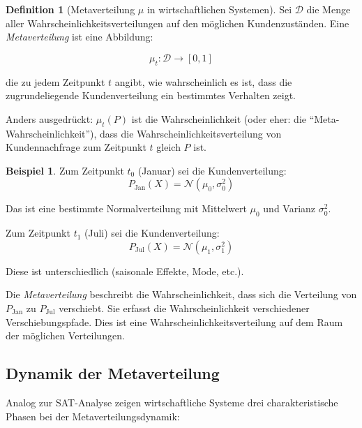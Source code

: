 \documentclass[a4paper, 12pt, twoside, openright]{report}
\theoremstyle{definition}
\newtheorem{definition}[theorem]{Definition}
\newtheorem{example}[theorem]{Beispiel}
\theoremstyle{definition}
\begin{document}
\begin{definition}[Metaverteilung $\mu$ in wirtschaftlichen Systemen]
Sei $\mathcal{D}$ die Menge aller Wahrscheinlichkeitsverteilungen auf den möglichen Kundenzuständen. Eine \emph{Metaverteilung} ist eine Abbildung:

\begin{equation}
\mu_t: \mathcal{D} \to [0, 1]
\label{eq:metadistribution}
\end{equation}

die zu jedem Zeitpunkt $t$ angibt, wie wahrscheinlich es ist, dass die zugrundeliegende Kundenverteilung ein bestimmtes Verhalten zeigt.

Anders ausgedrückt: $\mu_t(P)$ ist die Wahrscheinlichkeit (oder eher: die ``Meta-Wahrscheinlichkeit''), dass die Wahrscheinlichkeitsverteilung von Kundennachfrage zum Zeitpunkt $t$ gleich $P$ ist.
\end{definition}

\begin{example}
Zum Zeitpunkt $t_0$ (Januar) sei die Kundenverteilung:
$$P_{\text{Jan}}(X) = \mathcal{N}(\mu_0, \sigma_0^2)$$

Das ist eine bestimmte Normalverteilung mit Mittelwert $\mu_0$ und Varianz $\sigma_0^2$.

Zum Zeitpunkt $t_1$ (Juli) sei die Kundenverteilung:
$$P_{\text{Jul}}(X) = \mathcal{N}(\mu_1, \sigma_1^2)$$

Diese ist unterschiedlich (saisonale Effekte, Mode, etc.).

Die \emph{Metaverteilung} beschreibt die Wahrscheinlichkeit, dass sich die Verteilung von $P_{\text{Jan}}$ zu $P_{\text{Jul}}$ verschiebt. Sie erfasst die Wahrscheinlichkeit verschiedener Verschiebungspfade. Dies ist eine Wahrscheinlichkeitsverteilung auf dem Raum der möglichen Verteilungen.
\end{example}

\subsection{Dynamik der Metaverteilung}

Analog zur SAT-Analyse zeigen wirtschaftliche Systeme drei charakteristische Phasen bei der Metaverteilungsdynamik:
\end{document}
